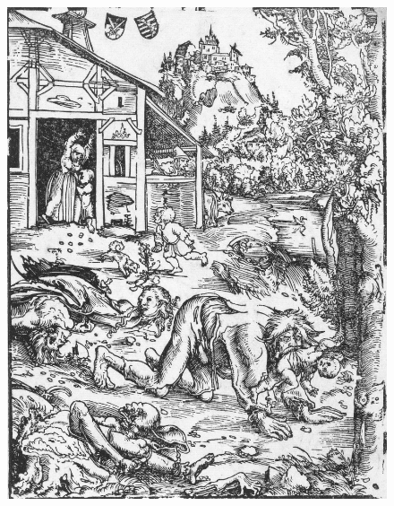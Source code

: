 {\begin{figure}[p]
  \centering
  \includegraphics[keepaspectratio,width=\textwidth]{figures/Werewolf-with-bodies-small.jpg}
  \caption{}
  \label{fig:werewolf}
\end{figure}

\clearpage{}
\thispagestyle{titleontop}

}
